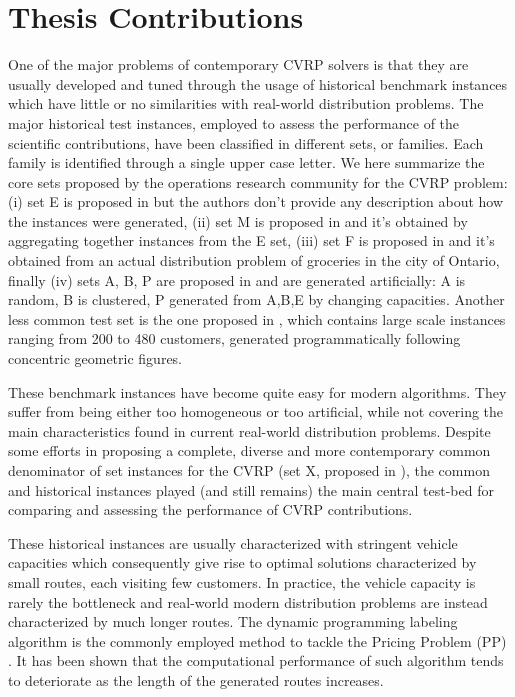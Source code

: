 \section{Thesis Contributions}
\label{sec:intro-thesis-contributions}

One of the major problems of contemporary CVRP solvers
is that they are usually developed and tuned through the usage
of historical benchmark instances which
have little or no similarities with real-world distribution problems.
The major historical test instances,
employed to assess the performance of the scientific contributions,
have been classified in different sets, or families.
Each family is identified through a single upper case letter.
We here summarize the core sets proposed by the operations research community for the CVRP problem:
(i) set E is proposed in \textcite{christofides1969} but the authors don't provide any
description about how the instances were generated,
(ii) set M is proposed in \textcite{christofides1979} and
it's obtained by aggregating together instances from the E set,
(iii) set F is proposed in \textcite{fisher1994} and it's obtained from an actual distribution problem of groceries in the city of Ontario,
finally (iv) sets A, B, P are proposed in \textcite{augerat1995} and are generated artificially: A is random, B is clustered, P generated from A,B,E by changing capacities.
Another less common test set is the one proposed in \textcite{golden1998},
which contains large scale instances ranging from 200 to 480 customers,
generated programmatically following concentric geometric figures.

These benchmark instances have become quite easy for modern algorithms.
They suffer from being either too homogeneous or too artificial,
while not covering the main characteristics found in current real-world distribution problems.
Despite some efforts in proposing a complete, diverse and more contemporary common denominator
of set instances for the CVRP (set X, proposed in \textcite{uchoa2017}),
the common and historical instances played (and still remains) the main central test-bed for comparing
and assessing the performance of CVRP contributions.

These historical instances are usually characterized with stringent vehicle capacities
which consequently give rise to optimal solutions characterized by small routes, each visiting few customers.
In practice, the vehicle capacity is rarely the bottleneck and
real-world modern distribution problems are instead characterized by much longer routes.
The dynamic programming labeling algorithm
\parencite{desrochers1992,feillet2004}
is the commonly employed method to tackle the Pricing Problem (PP) \parencite{gutierrez-jarpa2010, archetti2011, bettinelli2011, contardo2014, contardo2015, pecin2017new, pecin2017improved, pessoa2020a}.
It has been shown that the computational performance of such algorithm
tends to deteriorate as the length of the generated routes increases.

